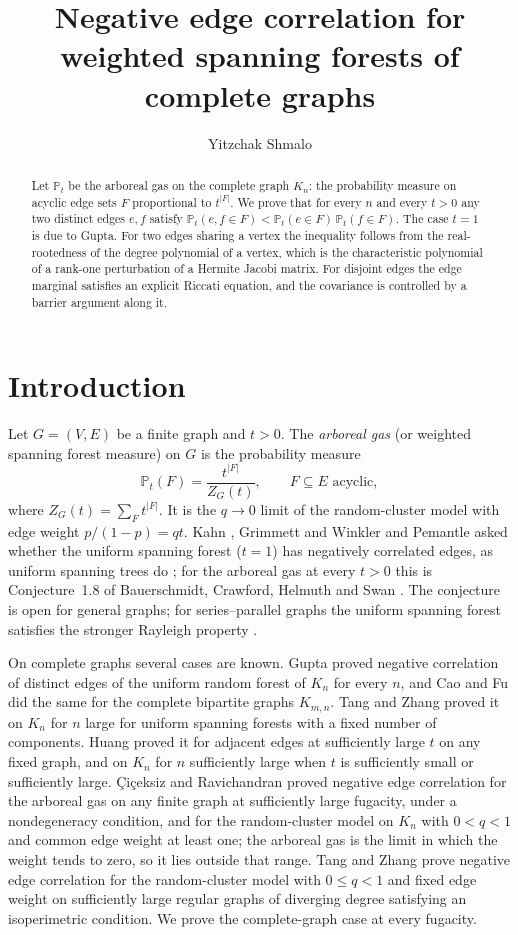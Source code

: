\documentclass[11pt]{amsart}
\title[Forests of complete graphs]{Negative edge correlation for weighted spanning forests of complete graphs}
\author{Yitzchak Shmalo}
\date{}
\theoremstyle{remark}
\newcommand{\Pt}{\mathbb{P}_t}
\begin{document}
\begin{abstract}
Let $\Pt$ be the arboreal gas on the complete graph $K_n$: the probability measure on
acyclic edge sets $F$ proportional to $t^{|F|}$. We prove that for every $n$ and every
$t>0$ any two distinct edges $e,f$ satisfy $\Pt(e,f\in F)<\Pt(e\in F)\,\Pt(f\in F)$.
The case $t=1$ is due to Gupta. For two edges sharing a vertex the inequality follows
from the real-rootedness of the degree polynomial of a vertex, which is the
characteristic polynomial of a rank-one perturbation of a Hermite Jacobi matrix. For
disjoint edges the edge marginal satisfies an explicit Riccati equation, and the
covariance is controlled by a barrier argument along it.
\end{abstract}

\maketitle

\section{Introduction}

Let $G=(V,E)$ be a finite graph and $t>0$. The \emph{arboreal gas} (or weighted
spanning forest measure) on $G$ is the probability measure
\[
\Pt(F)=\frac{t^{|F|}}{Z_G(t)},\qquad F\subseteq E \text{ acyclic},
\]
where $Z_G(t)=\sum_F t^{|F|}$. It is the $q\to0$ limit of the random-cluster model with
edge weight $p/(1-p)=qt$. Kahn \cite{Kahn}, Grimmett and Winkler \cite{GW} and
Pemantle \cite{Pemantle} asked whether the uniform spanning forest ($t=1$) has
negatively correlated edges, as uniform spanning trees do \cite{BP,FM}; for the arboreal gas at every
$t>0$ this is Conjecture~1.8 of Bauerschmidt, Crawford, Helmuth and Swan \cite{BCHS}.
The conjecture is open for general graphs; for series--parallel graphs the uniform spanning forest satisfies the stronger Rayleigh property \cite{Erickson}.

On complete graphs several cases are known. Gupta \cite{Gupta} proved negative
correlation of distinct edges of the uniform random forest of $K_n$ for every $n$, and Cao and Fu \cite{CF} did the same for the complete bipartite graphs $K_{m,n}$. Tang and Zhang \cite{TZ2} proved it on $K_n$ for $n$ large for uniform spanning forests with a fixed number of components.
Huang \cite{Huang} proved it for adjacent edges at sufficiently large $t$ on any fixed
graph, and on $K_n$ for $n$ sufficiently large when $t$ is sufficiently small or
sufficiently large. \c{C}i\c{c}eksiz and Ravichandran \cite{CR} proved negative edge
correlation for the arboreal gas on any finite graph at sufficiently large fugacity,
under a nondegeneracy condition, and for the random-cluster model on $K_n$ with
$0<q<1$ and common edge weight at least one; the arboreal gas is the limit in which the
weight tends to zero, so it lies outside that range. Tang and Zhang \cite{TZ} prove
negative edge correlation for the random-cluster model with $0\le q<1$ and fixed edge
weight on sufficiently large regular graphs of diverging degree satisfying an
isoperimetric condition. We prove the complete-graph case at
every fugacity.
\end{document}
